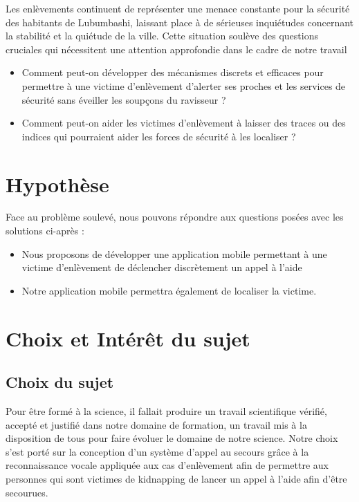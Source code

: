 Les enlèvements continuent de représenter une menace constante pour la sécurité des habitants de Lubumbashi, laissant place à de sérieuses inquiétudes concernant la stabilité et la quiétude de la ville.
Cette situation soulève des questions cruciales qui nécessitent une attention approfondie dans le cadre de notre travail

\begin{itemize}
	\item Comment peut-on développer des mécanismes discrets et efficaces pour permettre à une victime d'enlèvement d'alerter ses proches et les services de sécurité sans éveiller les soupçons du ravisseur ? 
	
	\item Comment peut-on aider les victimes d'enlèvement à laisser des traces ou des indices qui pourraient aider les forces de sécurité à les localiser ?
	
\end{itemize}

\section{Hypothèse}
Face au problème soulevé, nous pouvons répondre aux questions posées avec les solutions ci-après :

\begin{itemize}
\item Nous proposons de développer une application mobile permettant à une victime d'enlèvement de déclencher discrètement un appel à l'aide

\item Notre application mobile permettra également de localiser la victime.

\end{itemize}

\section{Choix et Intérêt du sujet}

\subsection{Choix du sujet}

Pour être formé à la science, il fallait produire un travail scientifique vérifié, accepté et justifié dans notre domaine de formation, un travail mis à la disposition de tous pour faire évoluer le domaine de notre science. Notre choix s'est porté sur la conception d'un système d’appel au secours grâce à la reconnaissance vocale appliquée aux cas d'enlèvement afin de permettre aux personnes qui sont victimes de kidnapping de lancer un appel à l'aide afin d'être secourues.

